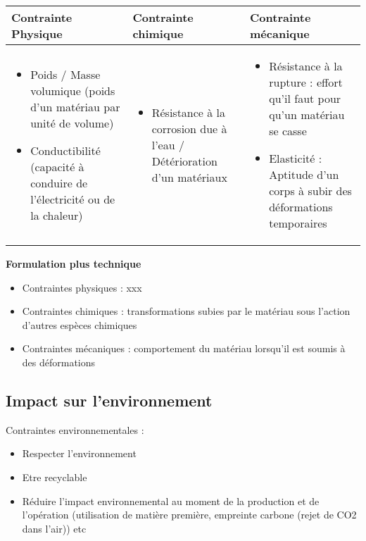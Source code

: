 \documentclass[a4paper,12pt]{article}
\begin{document}
\begin{tabular}{p{5cm}p{5cm}p{5cm}}
  \toprule
  {Contrainte Physique} & {Contrainte chimique} & {Contrainte mécanique} \\
  \midrule
  \begin{itemize}[noitemsep]
    \item Poids / Masse volumique (poids d'un matériau par unité de volume)
    \item Conductibilité (capacité à conduire de l'électricité ou de la chaleur)
  \end{itemize} & 
  \begin{itemize}[noitemsep]
    \item Résistance à la corrosion due à l'eau / Détérioration d'un matériaux
  \end{itemize}
   & 
   \begin{itemize}[noitemsep]
    \item Résistance à la rupture : effort qu'il faut pour qu'un matériau se casse
    \item Elasticité : Aptitude d'un corps à subir des déformations temporaires 
  \end{itemize} \\
  \bottomrule
\end{tabular}

\vspace{1em}

\textbf{Formulation plus technique}


\begin{itemize}[noitemsep]
  \item Contraintes physiques : xxx
  \item Contraintes chimiques : transformations subies par le matériau sous l'action d'autres espèces chimiques
  \item Contraintes mécaniques : comportement du matériau lorsqu'il est soumis à des déformations
\end{itemize}


\subsection{Impact sur l'environnement}

Contraintes environnementales : 
\begin{itemize}[noitemsep]
  \item Respecter l'environnement
  \item Etre recyclable
  \item Réduire l'impact environnemental au moment de la production et de l'opération (utilisation de matière première, empreinte carbone (rejet de CO2 dans l'air)) etc
\end{itemize}
\end{document}
